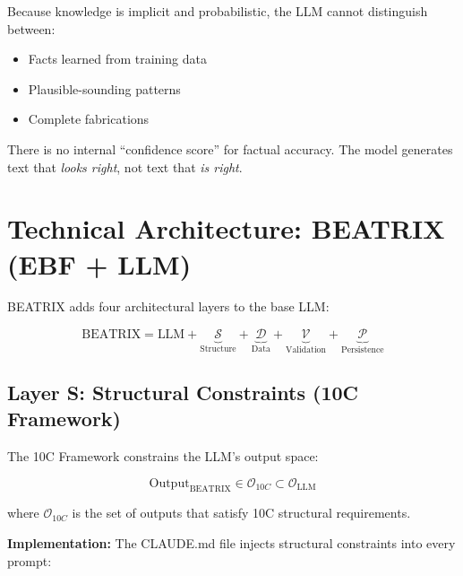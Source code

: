 \begin{tcolorbox}[colback=red!5!white, colframe=red!75!black,
    title=The Hallucination Problem]
Because knowledge is implicit and probabilistic, the LLM cannot distinguish between:
\begin{itemize}[nosep]
    \item Facts learned from training data
    \item Plausible-sounding patterns
    \item Complete fabrications
\end{itemize}

There is no internal ``confidence score'' for factual accuracy. The model generates text that \textit{looks right}, not text that \textit{is right}.
\end{tcolorbox}


\section{Technical Architecture: BEATRIX (EBF + LLM)}
\label{sec:bx-architecture}

BEATRIX adds four architectural layers to the base LLM:

\begin{equation}
\text{BEATRIX} = \text{LLM} + \underbrace{\mathcal{S}}_{\text{Structure}} + \underbrace{\mathcal{D}}_{\text{Data}} + \underbrace{\mathcal{V}}_{\text{Validation}} + \underbrace{\mathcal{P}}_{\text{Persistence}}
\end{equation}

\subsection{Layer S: Structural Constraints (10C Framework)}

The 10C Framework constrains the LLM's output space:

\begin{equation}
\text{Output}_{\text{BEATRIX}} \in \mathcal{O}_{10C} \subset \mathcal{O}_{\text{LLM}}
\end{equation}

where $\mathcal{O}_{10C}$ is the set of outputs that satisfy 10C structural requirements.

\textbf{Implementation:} The CLAUDE.md file injects structural constraints into every prompt:

